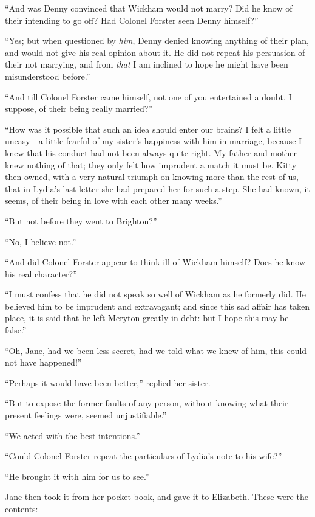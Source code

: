 ``And was Denny convinced that Wickham would not marry? Did he know of their intending to go off? Had Colonel Forster seen Denny himself?''

``Yes; but when questioned by \textit{him}, Denny denied knowing anything of their plan, and would not give his real opinion about it. He did not repeat his persuasion of their not marrying, and from \textit{that} I am inclined to hope he might have been misunderstood before.''

``And till Colonel Forster came himself, not one of you entertained a doubt, I suppose, of their being really married?''

``How was it possible that such an idea should enter our brains? I felt a little uneasy---a little fearful of my sister's happiness with him in marriage, because I knew that his conduct had not been always quite right. My father and mother knew nothing of that; they only felt how imprudent a match it must be. Kitty then owned, with a very natural triumph on knowing more than the rest of us, that in Lydia's last letter she had prepared her for such a step. She had known, it seems, of their being in love with each other many weeks.''

``But not before they went to Brighton?''

``No, I believe not.''

``And did Colonel Forster appear to think ill of Wickham himself? Does he know his real character?''

``I must confess that he did not speak so well of Wickham as he formerly did. He believed him to be imprudent and extravagant; and since this sad affair has taken place, it is said that he left Meryton greatly in debt: but I hope this may be false.''

``Oh, Jane, had we been less secret, had we told what we knew of him, this could not have happened!''

``Perhaps it would have been better,'' replied her sister.

``But to expose the former faults of any person, without knowing what their present feelings were, seemed unjustifiable.''

``We acted with the best intentions.''

``Could Colonel Forster repeat the particulars of Lydia's note to his wife?''

``He brought it with him for us to see.''

Jane then took it from her pocket-book, and gave it to Elizabeth. These were the contents:---

